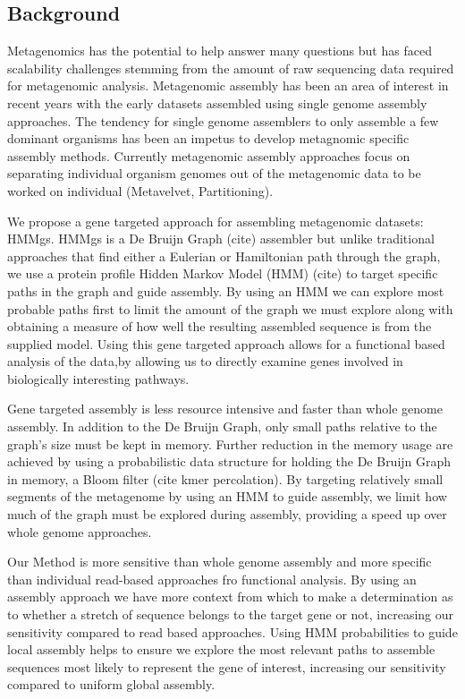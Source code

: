 \documentclass[10pt]{bmc_article}
\newenvironment{bmcformat}{\begin{raggedright}\baselineskip20pt\sloppy\setboolean{publ}{false}}{\end{raggedright}\baselineskip20pt\sloppy}
\begin{document}
\begin{bmcformat}
\section*{Background}
Metagenomics has the potential to help answer many questions but has faced scalability challenges stemming from the amount of raw sequencing data required for metagenomic analysis.  Metagenomic assembly has been an area of interest in recent years with the early datasets assembled using single genome assembly approaches.  The tendency for single genome assemblers to only assemble a few dominant organisms has been an impetus to develop metagnomic specific assembly methods.  Currently metagenomic assembly approaches focus on separating individual organism genomes out of the metagenomic data to be worked on individual (Metavelvet, Partitioning).  

We propose a gene targeted approach for assembling metagenomic datasets: HMMgs.  HMMgs is a De Bruijn Graph (cite) assembler but unlike traditional approaches that find either a Eulerian or Hamiltonian path through the graph, we use a protein profile Hidden Markov Model (HMM) (cite) to target specific paths in the graph and guide assembly. By using an HMM we can explore most probable paths first to limit the amount of the graph we must explore along with obtaining a measure of how well the resulting assembled sequence is from the supplied model.  Using this gene targeted approach allows for a functional based analysis of the data,by allowing us to directly examine genes involved in biologically interesting pathways.

Gene targeted assembly is less resource intensive and faster than whole genome assembly.  In addition to the De Bruijn Graph, only small paths relative to the graph's size must be kept in memory.  Further reduction in the memory usage are achieved by using a probabilistic data structure for holding the De Bruijn Graph in memory, a Bloom filter \cite{Bloom1970} (cite kmer percolation).  By targeting relatively small segments of the metagenome by using an HMM to guide assembly, we limit how much of the graph must be explored during assembly, providing a speed up over whole genome approaches.

Our Method is more sensitive than whole genome assembly and more specific than individual read-based approaches fro functional analysis.  By using an assembly approach we have more context from which to make a determination as to whether a stretch of sequence belongs to the target gene or not, increasing our sensitivity compared to read based approaches.  Using HMM probabilities to guide local assembly helps to ensure we explore the most relevant paths to assemble sequences most likely to represent the gene of interest, increasing our sensitivity compared to uniform global assembly.


\end{bmcformat}
\end{document}
